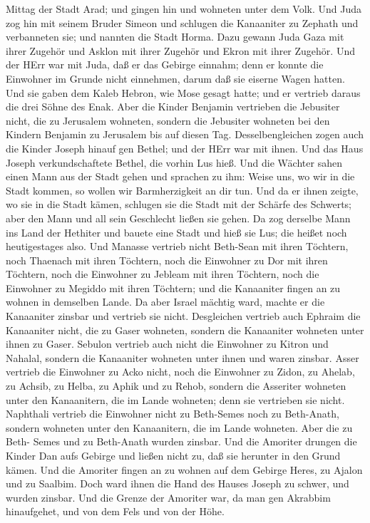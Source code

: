 Mittag der Stadt Arad; und gingen hin und wohneten unter dem Volk.
 Und Juda zog hin mit seinem Bruder Simeon und schlugen die
Kanaaniter zu Zephath und verbanneten sie; und nannten die Stadt Horma.
 Dazu gewann Juda Gaza mit ihrer Zugehör und Asklon mit
ihrer Zugehör und Ekron mit ihrer Zugehör.  Und der HErr
war mit Juda, daß er das Gebirge einnahm; denn er konnte die Einwohner
im Grunde nicht einnehmen, darum daß sie eiserne Wagen hatten.
 Und sie gaben dem Kaleb Hebron, wie Mose gesagt hatte; und
er vertrieb daraus die drei Söhne des Enak.  Aber die
Kinder Benjamin vertrieben die Jebusiter nicht, die zu Jerusalem
wohneten, sondern die Jebusiter wohneten bei den Kindern Benjamin zu
Jerusalem bis auf diesen Tag.  Desselbengleichen zogen auch
die Kinder Joseph hinauf gen Bethel; und der HErr war mit ihnen.
 Und das Haus Joseph verkundschaftete Bethel, die vorhin
Lus hieß.  Und die Wächter sahen einen Mann aus der Stadt
gehen und sprachen zu ihm: Weise uns, wo wir in die Stadt kommen, so
wollen wir Barmherzigkeit an dir tun.  Und da er ihnen
zeigte, wo sie in die Stadt kämen, schlugen sie die Stadt mit der
Schärfe des Schwerts; aber den Mann und all sein Geschlecht ließen sie
gehen.  Da zog derselbe Mann ins Land der Hethiter und
bauete eine Stadt und hieß sie Lus; die heißet noch heutigestages also.
 Und Manasse vertrieb nicht Beth-Sean mit ihren Töchtern,
noch Thaenach mit ihren Töchtern, noch die Einwohner zu Dor mit ihren
Töchtern, noch die Einwohner zu Jebleam mit ihren Töchtern, noch die
Einwohner zu Megiddo mit ihren Töchtern; und die Kanaaniter fingen an zu
wohnen in demselben Lande.  Da aber Israel mächtig ward,
machte er die Kanaaniter zinsbar und vertrieb sie nicht. 
Desgleichen vertrieb auch Ephraim die Kanaaniter nicht, die zu Gaser
wohneten, sondern die Kanaaniter wohneten unter ihnen zu Gaser.
 Sebulon vertrieb auch nicht die Einwohner zu Kitron und
Nahalal, sondern die Kanaaniter wohneten unter ihnen und waren zinsbar.
 Asser vertrieb die Einwohner zu Acko nicht, noch die
Einwohner zu Zidon, zu Ahelab, zu Achsib, zu Helba, zu Aphik und zu
Rehob,  sondern die Asseriter wohneten unter den
Kanaanitern, die im Lande wohneten; denn sie vertrieben sie nicht.
 Naphthali vertrieb die Einwohner nicht zu Beth-Semes noch
zu Beth-Anath, sondern wohneten unter den Kanaanitern, die im Lande
wohneten. Aber die zu Beth- Semes und zu Beth-Anath wurden zinsbar.
 Und die Amoriter drungen die Kinder Dan aufs Gebirge und
ließen nicht zu, daß sie herunter in den Grund kämen.  Und
die Amoriter fingen an zu wohnen auf dem Gebirge Heres, zu Ajalon und zu
Saalbim. Doch ward ihnen die Hand des Hauses Joseph zu schwer, und
wurden zinsbar.  Und die Grenze der Amoriter war, da man
gen Akrabbim hinaufgehet, und von dem Fels und von der Höhe.

